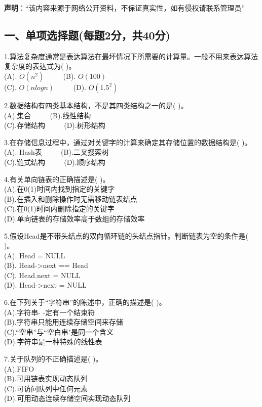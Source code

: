 
\textbf{声明}：“该内容来源于网络公开资料，不保证真实性，如有侵权请联系管理员”

\subsection{一、单项选择题(每题2分，共40分)}
1.算法复杂度通常是表达算法在最坏情况下所需要的计算量。一般不用来表达算法复杂度的表达式为( )。 \\
(A). $O(n^2)$  $\qquad$ (B). $O(100)$ \\
(C). $O(nlogn)$ $\qquad$ (D). $O(1.5^2)$

2.数据结构有四类基本结构，不是其四类结构之一的是( )。 \\
(A).集合 $\qquad$ (B).线性结构 \\
(C).存储结构 $\qquad$ (D).树形结构

3.在存储信息过程中，通过对关键字的计算来确定其存储位置的数据结构是( )。 \\
(A). Hash表  $\qquad$  (B).二叉搜索树  \\
(C).链式结构  $\qquad$  (D).顺序结构

4.有关单向链表的正确描述是( )。 \\
(A).在0(1)时间内找到指定的关键字 \\
(B).在插入和删除操作时无需移动链表结点 \\
(C).在0(1)时间内删除指定的关键字 \\
(D).单向链表的存储效率高于数组的存储效率

5.假设Head是不带头结点的双向循环链的头结点指针。判断链表为空的条件是( )。 \\
(A). Head = NULL  \\
(B). Head->next == Head  \\
(C). Head.next = NULL  \\
(D). Head->next = NULL

6.在下列关于“字符串”的陈述中，正确的描述是( )。 \\
(A).字符串- -定有一个结束符 \\
(B).字符串只能用连续存储空间来存储 \\
(C).“空串”与“空白串"是同一个含义 \\
(D).字符串是一种特殊的线性表

7.关于队列的不正确描述是( )。 \\
(A).FIFO \\
(B).可用链表实现动态队列 \\
(C).可访问队列中任何元素 \\
(D).可用动态连续存储空间实现动态队列

